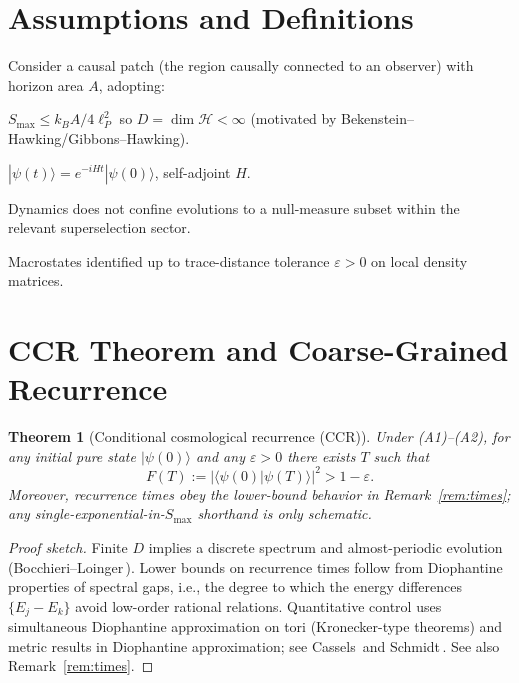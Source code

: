 \documentclass[12pt]{article}
\newcommand{\Smax}{S_{\max}}
\newtheorem{theorem}{Theorem}
\theoremstyle{remark}
\begin{document}
\section{Assumptions and Definitions}
Consider a causal patch (the region causally connected to an observer) with horizon area $A$, adopting:
\begin{description}[leftmargin=1.5em,labelsep=0.5em]
  \item[(A1) Finite information bound:] $\Smax \leq k_B A/4\ell^2_P$ so $D = \dim \mathcal{H} < \infty$ (motivated by Bekenstein–Hawking/Gibbons–Hawking).
  \item[(A2) Unitary dynamics:] $|\psi(t)\rangle=e^{-iHt}|\psi(0)\rangle$, self-adjoint $H$.
  \item[(A3) Sector mixing (optional):] Dynamics does not confine evolutions to a null-measure subset within the relevant superselection sector.
  \item[(A4) Finite-resolution observers:] Macrostates identified up to trace-distance tolerance $\varepsilon>0$ on local density matrices.
\end{description}

\section{CCR Theorem and Coarse-Grained Recurrence}
\begin{theorem}[Conditional cosmological recurrence (CCR)]\label{thm:CCR}
Under (A1)--(A2), for any initial pure state $|\psi(0)\rangle$ and any $\varepsilon>0$ there exists $T$ such that
\begin{equation}
 F(T):=|\langle\psi(0)|\psi(T)\rangle|^2 > 1-\varepsilon.
\end{equation}
Moreover, recurrence times obey the lower-bound behavior in Remark~\ref{rem:times}; any single-exponential-in-$\Smax$ shorthand is only schematic.
\end{theorem}
\begin{proof}[Proof sketch]
Finite $D$ implies a discrete spectrum and almost-periodic evolution (Bocchieri--Loinger\,\cite{BocchieriLoinger1957}). 
Lower bounds on recurrence times follow from Diophantine properties of spectral gaps, i.e., the degree to which the energy differences $\{E_j{-}E_k\}$ avoid low-order rational relations. Quantitative control uses simultaneous Diophantine approximation on tori (Kronecker-type theorems) and metric results in Diophantine approximation; see Cassels\,\cite{Cassels1957} and Schmidt\,\cite{Schmidt1980}. See also Remark~\ref{rem:times}.
\end{proof}
\end{document}
